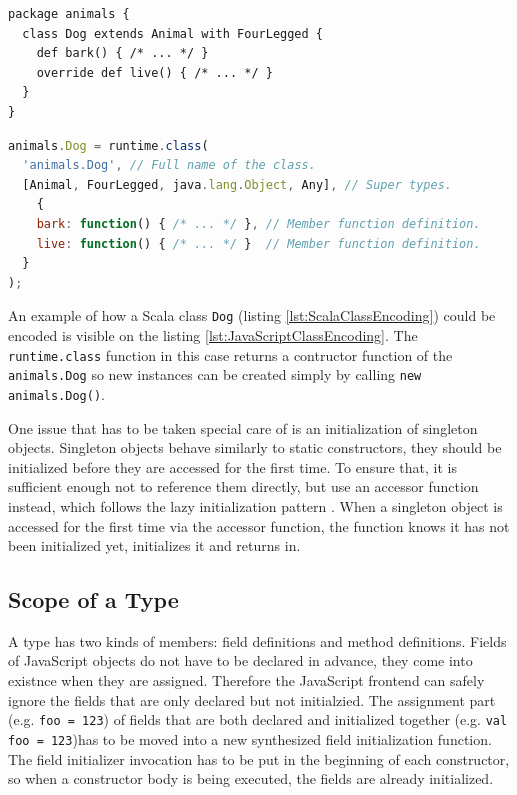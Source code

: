 \documentclass[12pt,a4paper]{report}
\begin{document}
\begin{lstlisting}[caption={Scala \texttt{Dog} class example.},label={lst:ScalaClassEncoding}]
package animals {
  class Dog extends Animal with FourLegged {
    def bark() { /* ... */ }
    override def live() { /* ... */ }
  }
}
\end{lstlisting}

\begin{lstlisting}[language=JavaScript,caption={The \texttt{Dog} class encoded using the \texttt{runtime.class} function},label={lst:JavaScriptClassEncoding}]
animals.Dog = runtime.class(
  'animals.Dog', // Full name of the class.                              
  [Animal, FourLegged, java.lang.Object, Any], // Super types.
	{
    bark: function() { /* ... */ }, // Member function definition.
    live: function() { /* ... */ }  // Member function definition.
  }
);
\end{lstlisting}

An example of how a Scala class \texttt{Dog} (listing \ref{lst:ScalaClassEncoding}) could be encoded is visible on the listing \ref{lst:JavaScriptClassEncoding}. The \texttt{runtime.class} function in this case returns a contructor function of the \texttt{animals.Dog} so new instances can be created simply by calling \texttt{new animals.Dog()}.

One issue that has to be taken special care of is an initialization of singleton objects. Singleton objects behave similarly to static constructors, they should be initialized before they are accessed for the first time. To ensure that, it is sufficient enough not to reference them directly, but use an accessor function instead, which follows the lazy initialization pattern \cite{Lazy}. When a singleton object is accessed for the first time via the accessor function, the function knows it has not been initialized yet, initializes it and returns in.

\subsection{Scope of a Type}

A type has two kinds of members: field definitions and method definitions. Fields of JavaScript objects do not have to be declared in advance, they come into existnce when they are assigned. Therefore the JavaScript frontend can safely ignore the fields that are only declared but not initialzied. The assignment part (e.g. \texttt{foo = 123}) of fields that are both declared and initialized together (e.g. \texttt{val foo = 123})has to be moved into a new synthesized field initialization function. The field initializer invocation has to be put in the beginning of each constructor, so when a constructor body is being executed, the fields are already initialized.
\end{document}
